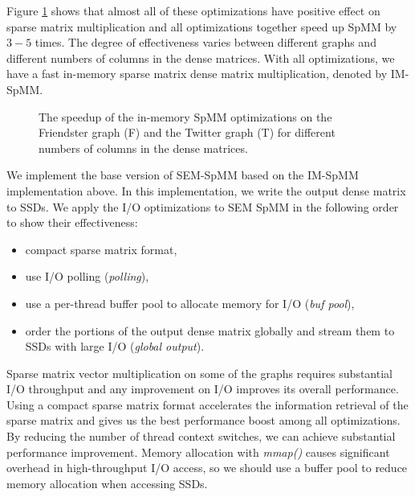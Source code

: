 Figure \ref{perf:spmm_opt} shows that almost all of these optimizations have
positive effect on sparse matrix multiplication and all optimizations
together speed up SpMM by $3-5$ times. The degree of effectiveness
varies between different graphs and different numbers of columns in
the dense matrices. 
With all optimizations, we have a fast
in-memory sparse matrix dense matrix multiplication, denoted by IM-SpMM.

\begin{figure}
	\begin{center}
		\footnotesize
		
		\caption{The speedup of the in-memory SpMM optimizations on the Friendster
			graph (F) and the Twitter graph (T) for different numbers of
			columns in the dense matrices.}
		\label{perf:spmm_opt}
	\end{center}
\end{figure}

We implement the base version of SEM-SpMM based on the IM-SpMM implementation
above. In this implementation, we write the output dense matrix to SSDs.
We apply the I/O optimizations to SEM SpMM in the following order to show
their effectiveness: 
\begin{itemize} \itemsep1pt \parskip0pt 
	\item compact sparse matrix format,
	\item use I/O polling (\textit{polling}),
	\item use a per-thread buffer pool to allocate memory for I/O
		(\textit{buf pool}),
	\item order the portions of the output dense matrix globally and stream them
		to SSDs with large I/O (\textit{global output}).
\end{itemize}

Sparse matrix vector multiplication on some of the graphs requires substantial
I/O throughput and any improvement on I/O improves its overall performance.
Using a compact sparse matrix format accelerates the information retrieval
of the sparse matrix and gives us the best performance boost among all
optimizations. By reducing the number of thread context switches, we can
achieve substantial performance improvement. Memory allocation with
\textit{mmap()} causes significant overhead in high-throughput I/O access,
so we should use a buffer pool to reduce memory allocation when accessing SSDs.

